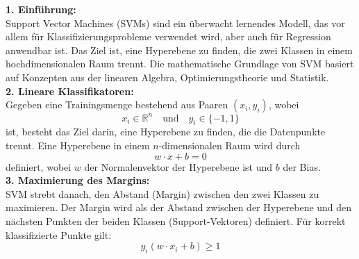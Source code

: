 \documentclass[12pt]{article}
\begin{document}
\textbf{1. Einführung:}\\
Support Vector Machines (SVMs) sind ein überwacht lernendes Modell, das vor allem für Klassifizierungsprobleme verwendet wird, aber auch für Regression anwendbar ist. Das Ziel ist, eine Hyperebene zu finden, die zwei Klassen in einem hochdimensionalen Raum trennt. Die mathematische Grundlage von SVM basiert auf Konzepten aus der linearen Algebra, Optimierungstheorie und Statistik.\\[0.2cm]
%
\textbf{2. Lineare Klassifikatoren:}\\
Gegeben eine Trainingsmenge bestehend aus Paaren \((x_i, y_i)\), wobei
\[
x_i \in \mathbb{R}^n \quad \text{und} \quad y_i \in \{-1, 1\}
\]
ist, besteht das Ziel darin, eine Hyperebene zu finden, die die Datenpunkte trennt. Eine Hyperebene in einem \(n\)-dimensionalen Raum wird durch
\[
w \cdot x + b = 0
\]
definiert, wobei \(w\) der Normalenvektor der Hyperebene ist und \(b\) der Bias. \\[0.2cm]
%
\textbf{3. Maximierung des Margins:}\\
SVM strebt danach, den Abstand (Margin) zwischen den zwei Klassen zu maximieren. Der Margin wird als der Abstand zwischen der Hyperebene und den nächsten Punkten der beiden Klassen (Support-Vektoren) definiert. Für korrekt klassifizierte Punkte gilt:
\[
y_i (w \cdot x_i + b) \geq 1
\]
\end{document}
